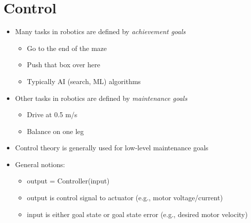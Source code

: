 \documentclass[10pt]{article}
\begin{document}
\section*{Control}
\begin{itemize}
	\item Many tasks in robotics are defined by \textit{achievement goals}
	\begin{itemize}
        \item Go to the end of the maze
        \item Push that box over here
        \item Typically AI (search, ML) algorithms
    \end{itemize}
    \item Other tasks in robotics are defined by \textit{maintenance goals}
    \begin{itemize}
        \item Drive at 0.5 m/s
        \item Balance on one leg
    \end{itemize} 
    \item Control theory is generally used for low-level maintenance goals
    \item General notions:
    \begin{itemize}
        \item output = Controller(input)
        \item output is control signal to actuator (e.g., motor voltage/current)
        \item input is either goal state or goal state error (e.g., desired motor velocity)
    \end{itemize}
\end{itemize}
\end{document}
